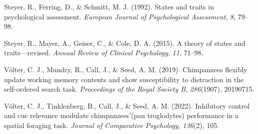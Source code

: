 \documentclass[
  man,floatsintext]{apa6}
\newlength{\cslhangindent}
\newlength{\cslentryspacingunit} %
\newenvironment{CSLReferences}[2] %
 {%
  \setlength{\parindent}{0pt}
  \ifodd #1
  \let\oldpar\par
  \def\par{\hangindent=\cslhangindent\oldpar}
  \fi
  \setlength{\parskip}{#2\cslentryspacingunit}
 }%
 {}
\begin{document}
\begin{CSLReferences}{1}{0}
\leavevmode{}%
Steyer, R., Ferring, D., \& Schmitt, M. J. (1992). States and traits in psychological assessment. \emph{European Journal of Psychological Assessment}, \emph{8}, 79--98.

\leavevmode{}%
Steyer, R., Mayer, A., Geiser, C., \& Cole, D. A. (2015). A theory of states and traits---revised. \emph{Annual Review of Clinical Psychology}, \emph{11}, 71--98.

\leavevmode{}%
Völter, C. J., Mundry, R., Call, J., \& Seed, A. M. (2019). Chimpanzees flexibly update working memory contents and show susceptibility to distraction in the self-ordered search task. \emph{Proceedings of the Royal Society B}, \emph{286}(1907), 20190715.

\leavevmode{}%
Völter, C. J., Tinklenberg, B., Call, J., \& Seed, A. M. (2022). Inhibitory control and cue relevance modulate chimpanzees'(pan troglodytes) performance in a spatial foraging task. \emph{Journal of Comparative Psychology}, \emph{136}(2), 105.

\end{CSLReferences}
\end{document}
